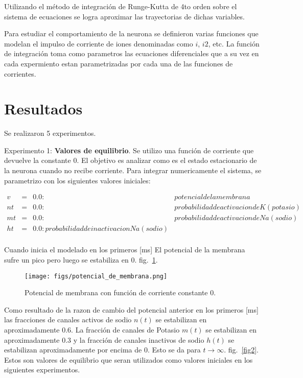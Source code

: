 \documentclass[aps,prl,twocolumn,groupedaddress]{revtex4-2}
\begin{document}
Utilizando el método de integración de Runge-Kutta de 4to orden  sobre el sistema de ecuaciones se logra aproximar las trayectorias de dichas variables.


Para estudiar el comportamiento de la neurona se definieron varias funciones que modelan el impulso de corriente de iones
denominadas como $i$, $i2$, etc.
La función de integración toma como parametros las ecuaciones diferenciales que a su vez en cada expermiento estan parametrizadas por cada una de las funciones de corrientes.
 

\section{Resultados}
Se realizaron 5 experimentos.

Experimento 1: \textbf{Valores de equilibrio}. Se utilizo una función de corriente que devuelve la constante 0. El objetivo es analizar como es el estado estacionario de la neurona cuando no recibe corriente.
Para integrar numericamente el sistema, se parametrizo con los siguientes valores iniciales:

\begin{eqnarray*}
{v}&=&0.0:&potencial de la membrana\\
{nt}&=&0.0:&probabilidad de activacion de K (potasio)\\
{mt}&=&0.0:&probabilidad de activacion de Na (sodio)\\
{ht}&=&0.0:probabilidad de inactivacion Na (sodio)\\
&
\end{eqnarray*}

Cuando inicia el modelado en los primeros [ms] El potencial de la membrana sufre un pico pero luego se estabiliza en 0. fig.~\ref{fig1}.

\begin{figure}[h!]
\centering
\texttt{[image: figs/potencial\_de\_membrana.png]}
\caption{Potencial de membrana con función de corriente constante 0. \label{fig1}}
\end{figure}


Como resultado de la razon de cambio del potencial anterior en los primeros [ms] las fracciones de canales activos de sodio $n(t)$ se estabilizan en aproximadamente 0.6. La fracción de canales de Potasio $m(t)$ se estabilizan en aproximadamente 0.3 y la fracción de canales inactivos de sodio $h(t)$ se estabilizan aproximadamente por encima de 0. Esto se da para ${t \to \infty}$. fig.~\ref{fig2}. Estos son valores de equilibrio que seran utilizados como valores iniciales en los siguientes experimentos.
\end{document}
